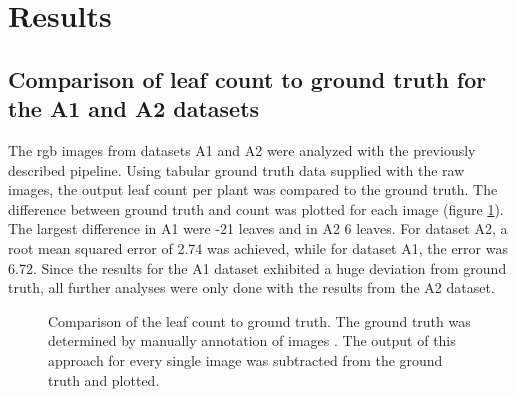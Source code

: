 \documentclass[paper=A4,bibliography=totocnumbered]{scrartcl}
\begin{document}
\clearpage
\section{Results}
\subsection{Comparison of leaf count to ground truth for the A1 and A2 datasets}
The rgb images from datasets A1 and A2 were analyzed with the previously described pipeline. Using tabular ground truth data supplied with the raw images, the output leaf count per plant was compared to the ground truth. The difference between ground truth and count was plotted for each image (figure \ref{fig:truth}). The largest difference in A1 were -21 leaves and in A2 6 leaves. For dataset A2, a root mean squared error of 2.74 was achieved, while for dataset A1, the error was 6.72. Since the results for the A1 dataset exhibited a huge deviation from ground truth, all further analyses were only done with the results from the A2 dataset.

\begin{figure}[h!]
	\qquad
	\caption{Comparison of the leaf count to ground truth. The ground truth was determined by manually annotation of images \citep{Scharr.2014}. The output of this approach for every single image was subtracted from the ground truth and plotted.}
	\label{fig:truth}
\end{figure}
\end{document}

